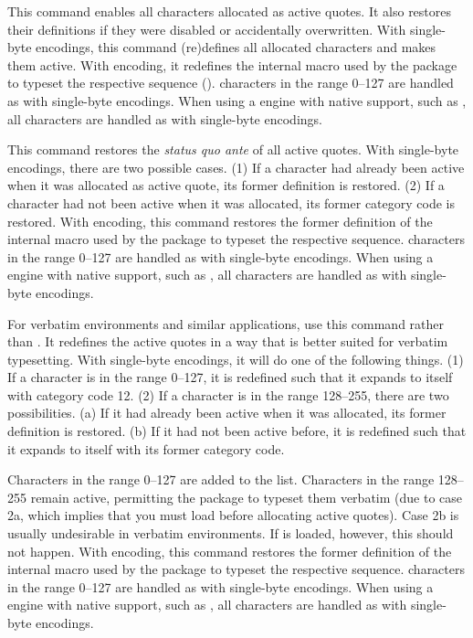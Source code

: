 \documentclass{ltxdockit}[2010/09/26]
\begin{document}
\begin{ltxsyntax}


This command enables all characters allocated as active quotes. It also restores their definitions if they were disabled or accidentally overwritten. With single-byte encodings, this command (re)defines all allocated characters and makes them active. With \utf encoding, it redefines the internal macro used by the  package to typeset the respective \utf sequence (). \utf characters in the range 0--127 are handled as with single-byte encodings. When using a \tex engine with native \utf support, such as \xetex, all characters are handled as with single-byte encodings.


This command restores the \emph{status quo ante} of all active quotes. With single-byte encodings, there are two possible cases. (1) If a character had already been active when it was allocated as active quote, its former definition is restored. (2) If a character had not been active when it was allocated, its former category code is restored. With \utf encoding, this command restores the former definition of the internal macro used by the  package to typeset the respective \utf sequence. \utf characters in the range 0--127 are handled as with single-byte encodings. When using a \tex engine with native \utf support, such as \xetex, all characters are handled as with single-byte encodings.


For verbatim environments and similar applications, use this command rather than . It redefines the active quotes in a way that is better suited for verbatim typesetting. With single-byte encodings, it will do one of the following things. (1) If a character is in the range 0--127, it is redefined such that it expands to itself with category code 12. (2) If a character is in the range 128--255, there are two possibilities. (a) If it had already been active when it was allocated, its former definition is restored. (b) If it had not been active before, it is redefined such that it expands to itself with its former category code.

Characters in the range 0--127 are added to the  list. Characters in the range 128--255 remain active, permitting the  package to typeset them verbatim (due to case 2a, which implies that you must load  before allocating active quotes). Case 2b is usually undesirable in verbatim environments. If  is loaded, however, this should not happen. With \utf encoding, this command restores the former definition of the internal macro used by the  package to typeset the respective \utf sequence. \utf characters in the range 0--127 are handled as with single-byte encodings. When using a \tex engine with native \utf support, such as \xetex, all characters are handled as with single-byte encodings.


\end{ltxsyntax}
\end{document}
